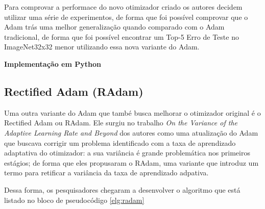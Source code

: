Para comprovar a performace do novo otimizador criado os autores decidem utilizar uma série de experimentos, de forma que foi possível comprovar que o Adam trás uma melhor generalização quando comparado com o Adam tradicional, de forma que foi possível encontrar um Top-5 Erro de Teste no ImageNet32x32 menor utilizando essa nova variante do Adam.

\textbf{Implementação em Python}

\subsection{Rectified Adam (RAdam)}

Uma outra variante do Adam que també busca melhorar o otimizador original é o Rectified Adam ou RAdam. Ele surgiu no trabalho \textit{On the Variance of the Adaptive Learning Rate and Beyond} dos autores \textcite{RAdamMethod} como uma atualização do Adam que buscava corrigir um problema identificado com a taxa de aprendizado adaptativa do otimizador: a sua variância é grande problemática nos primeiros estágios; de forma que eles propusaram o RAdam, uma variante que introduz um termo para retificar a variância da taxa de aprendizado adpativa.

Dessa forma, os pesquisadores chegaram a desenvolver o algoritmo que está listado no bloco de pseudocódigo \ref{elg:radam}

